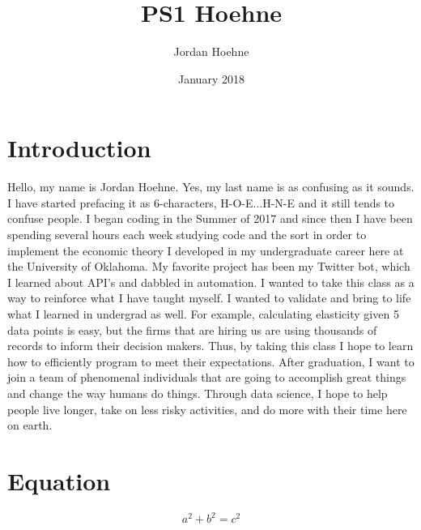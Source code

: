 \documentclass{article}
\title{PS1 Hoehne}
\author{Jordan Hoehne }
\date{January 2018}
\begin{document}
\maketitle

\section{Introduction}
Hello, my name is Jordan Hoehne. Yes, my last name is as confusing as it sounds. I have started prefacing it as 6-characters, H-O-E...H-N-E and it still tends to confuse people. I began coding in the Summer of 2017 and since then I have been spending several hours each week studying code and the sort in order to implement the economic theory I developed in my undergraduate career here at the University of Oklahoma. My favorite project has been my Twitter bot, which I learned about API's and dabbled in automation. I wanted to take this class as a way to reinforce what I have taught myself. I wanted to validate and bring to life what I learned in undergrad as well. For example, calculating elasticity given 5 data points is easy, but the firms that are hiring us are using thousands of records to inform their decision makers. Thus, by taking this class I hope to learn how to efficiently program to meet their expectations. After graduation, I want to join a team of phenomenal individuals that are going to accomplish great things and change the way humans do things. Through data science, I hope to help people live longer, take on less risky activities, and do more with their time here on earth.

\section{Equation}

\begin{equation}
    a^2 + b^2 = c^2
\end{equation}



\centering
\end{document}
